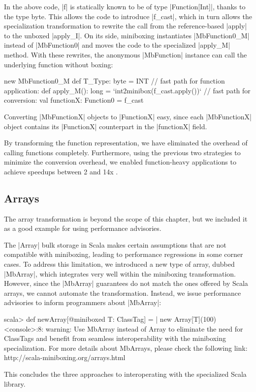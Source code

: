 In the above code, |f| is statically known to be of type |Function[Int]|, thanks to the type byte. This allows the code to introduce |f_cast|, which in turn allows the specialization transformation to rewrite the call from the reference-based |apply| to the unboxed |apply_I|. On its side, miniboxing instantiates |MbFunction0_M| instead of |MbFunction0| and moves the code to the specialized |apply_M| method. With these rewrites, the anonymous |MbFunction| instance can call the underlying function without boxing:

\begin{lstlisting-nobreak}
   new MbFunction0_M {
     def T_Type: byte = INT
     // fast path for function application:
     def apply_M(): long = `int2minibox(f_cast.apply())`
     // fast path for conversion:
     val functionX: Function0 = f_cast
   }
\end{lstlisting-nobreak}

Converting |MbFunctionX| objects to |FunctionX| easy, since each |MbFunctionX| object contains its |FunctionX| counterpart in the |functionX| field.

By transforming the function representation, we have eliminated the overhead of calling functions completely. Furthermore, using the previous two strategies to minimize the conversion overhead, we enabled function-heavy applications to achieve speedups between 2 and 14x \cite{ildl-tech, ildl-plugin-wiki}. 

\subsection{Arrays}
\label{mbox2:sec:mbarrays}

The array transformation \cite{romain-mbarrays} is beyond the scope of this chapter, but we included it as a good example for using performance advisories.

The |Array| bulk storage in Scala makes certain assumptions that are not compatible with miniboxing, leading to performance regressions in some corner cases. To address this limitation, we introduced a new type of array, dubbed |MbArray|, which integrates very well within the miniboxing transformation. However, since the |MbArray| guarantees do not match the ones offered by Scala arrays, we cannot automate the transformation. Instead, we issue performance advisories to inform programmers about |MbArray|:

\begin{lstlisting-nobreak-nolang}
scala> def newArray[@miniboxed T: ClassTag] =
       |   new Array[T](100)
<console>:8: warning: Use MbArray instead of Array to eliminate the need for ClassTags and benefit from seamless interoperability with the miniboxing specialization. For more details about MbArrays, please check the following link: http://scala-miniboxing.org/arrays.html
\end{lstlisting-nobreak-nolang}

This concludes the three approaches to interoperating with the specialized Scala library.